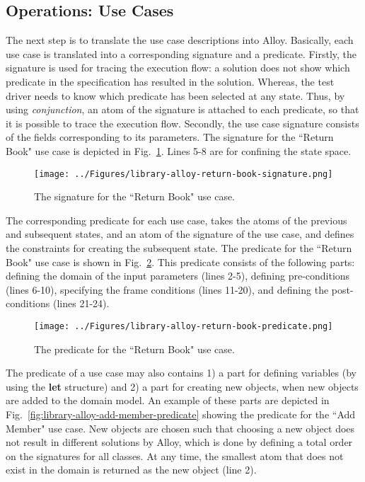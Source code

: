 \subsection{Operations: Use Cases}
\label{sec:alloy-usecases}
The next step is to translate the use case descriptions into Alloy. Basically, each use case is translated into a corresponding signature and a predicate. Firstly, the signature is used for tracing the execution flow: a solution does not show which predicate in the specification has resulted in the solution. Whereas, the test driver needs to know which predicate has been selected at any state. Thus, by using \textit{conjunction}, an atom of the signature is attached to each predicate, so that it is possible to trace the execution flow. Secondly, the use case signature consists of the fields corresponding to its parameters. The signature for the ``Return Book" use case is depicted in Fig.~\ref{fig:library-alloy-return-book-signature}. Lines 5-8 are for confining the state space.

\begin{figure}[h]
\centering
\texttt{[image: ../Figures/library-alloy-return-book-signature.png]}
\caption{The signature for the ``Return Book" use case.}
\label{fig:library-alloy-return-book-signature}
\end{figure}

The corresponding predicate for each use case, takes the atoms of the previous and subsequent states, and an atom of the signature of the use case, and defines the constraints for creating the subsequent state. The predicate for the ``Return Book" use case is shown in Fig.~\ref{fig:library-alloy-return-book-predicate}. This predicate consists of the following parts: defining the domain of the input parameters (lines 2-5), defining pre-conditions (lines 6-10), specifying the frame conditions (lines 11-20), and defining the post-conditions (lines 21-24). 

\begin{figure}[h]
\centering
\texttt{[image: ../Figures/library-alloy-return-book-predicate.png]}
\caption{The predicate for the ``Return Book" use case.}
\label{fig:library-alloy-return-book-predicate}
\end{figure}

The predicate of a use case may also contains 1) a part for defining variables (by using the \textbf{let} structure) and 2) a part for creating new objects, when new objects are added to the domain model. An example of these parts are depicted in Fig.~\ref{fig:library-alloy-add-member-predicate} showing the predicate for the ``Add Member" use case. New objects are chosen such that  choosing a new object does not result in different solutions by Alloy, which is done by defining a total order on the signatures for all classes. At any time, the smallest atom that does not exist in the domain is returned as the new object (line 2).


